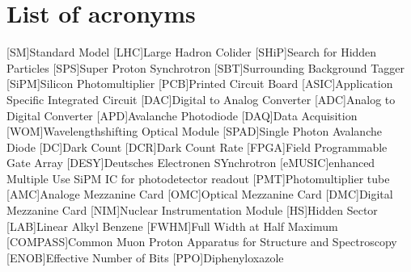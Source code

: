 \documentclass[listof=totoc,bibliography=totocnumbered,a4paper,english,12pt,twoside]{report}
\begin{document}
\onehalfspacing





\newpage
\thispagestyle{empty}
\mbox{}\newpage
{}

\thispagestyle{empty}
\mbox{}\newpage
\thispagestyle{empty}


\thispagestyle{empty}
\newpage
\thispagestyle{empty}
\mbox{}\newpage

\setcounter{page}{1}
\tableofcontents

\newpage


%
%
%
%

\appendix

\chapter{List of acronyms}
\begin{acronym}[SiPM]
    [SM]{Standard Model}
    [LHC]{Large Hadron Colider}
    [SHiP]{Search for Hidden Particles}
    [SPS]{Super Proton Synchrotron}
    [SBT]{Surrounding Background Tagger}
    [SiPM]{Silicon Photomultiplier}
    [PCB]{Printed Circuit Board}
    [ASIC]{Application Specific Integrated Circuit}
    [DAC]{Digital to Analog Converter}
    [ADC]{Analog to Digital Converter}
    [APD]{Avalanche Photodiode}
    [DAQ]{Data Acquisition}
    [WOM]{Wavelengthshifting Optical Module}
    [SPAD]{Single Photon Avalanche Diode}
    [DC]{Dark Count}
    [DCR]{Dark Count Rate}
    [FPGA]{Field Programmable Gate Array}
    [DESY]{Deutsches Electronen SYnchrotron}
    [eMUSIC]{enhanced Multiple Use SiPM IC for photodetector readout}
    [PMT]{Photomultiplier tube}
    [AMC]{Analoge Mezzanine Card}
    [OMC]{Optical Mezzanine Card}
    [DMC]{Digital Mezzanine Card}
    [NIM]{Nuclear Instrumentation Module}
    [HS]{Hidden Sector}
    [LAB]{Linear Alkyl Benzene}
    [FWHM]{Full Width at Half Maximum}
    [COMPASS]{Common Muon Proton Apparatus for Structure and Spectroscopy}
    [ENOB]{Effective Number of Bits}
    [PPO]{Diphenyloxazole}
\end{acronym}
\end{document}
